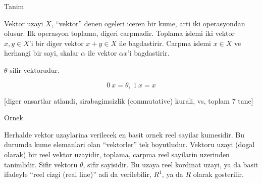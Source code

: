\documentclass[12pt,fleqn]{article}\usepackage{../common}
\begin{document}
Tanim 

Vektor uzayi $X$, ``vektor'' denen ogeleri iceren bir kume, arti iki
operasyondan olusur. Ilk operasyon toplama, digeri carpmadir. Toplama
islemi iki vektor $x,y \in X$'i bir diger vektor $x+y \in X$ ile
bagdastirir. Carpma islemi $x \in X$ ve herhangi bir sayi, skalar $\alpha$
ile vektor $\alpha x$'i bagdastirir. 

$\theta$ sifir vektorudur. 

\[ 0 \ x = \theta, \ 1 \ x = x \]

[diger onsartlar atlandi, sirabagimsizlik (commutative) kurali, vs, toplam 7
tane]

Ornek

Herhalde vektor uzaylarina verilecek en basit ornek reel sayilar
kumesidir. Bu durumda kume elemanlari olan ``vektorler'' tek
boyutludur. Vektoru uzayi (dogal olarak) bir reel vektor uzayidir, toplama,
carpma reel sayilarin uzerinden tanimlidir. Sifir vektoru $\theta$, sifir
sayisidir. Bu uzaya reel kordinat uzayi, ya da basit ifadeyle ``reel cizgi
(real line)'' adi da verilebilir, $R^1$, ya da $R$ olarak gosterilir. 
\end{document}
